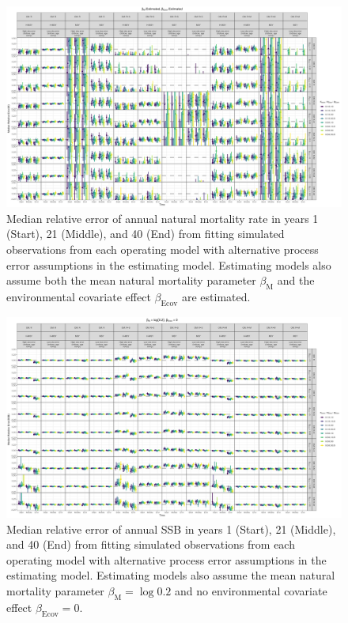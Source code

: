 \documentclass[
  12pt,
]{article}
\begin{document}
\begin{landscape}
\begin{figure}
\caption{Median relative error of annual natural mortality rate in years 1 (Start), 21 (Middle), and 40 (End) from fitting simulated observations from each operating model with alternative process error assumptions in the estimating model. Estimating models also assume both the mean natural mortality parameter $\beta_\text{M}$ and the environmental covariate effect $\beta_\text{Ecov}$ are estimated.}\label{annual_M_bias_M_estimated_beta_estimated}
\begin{center}
\includegraphics[height = \textheight]{annual_M_bias_all_PE_effect_M_estimated_beta_estimated.png}
\end{center}
\end{figure}
\end{landscape}

\begin{landscape}
\begin{figure}
\caption{Median relative error of annual SSB in years 1 (Start), 21 (Middle), and 40 (End) from fitting simulated observations from each operating model with alternative process error assumptions in the estimating model. Estimating models also assume the mean natural mortality parameter $\beta_\text{M} = \log 0.2$ and no environmental covariate effect $\beta_\text{Ecov} = 0$.}\label{SSB_bias_M_fixed_beta_fixed}
\begin{center}
\includegraphics[height = \textheight]{SSB_bias_all_PE_effect_M_fixed_beta_fixed.png}
\end{center}
\end{figure}
\end{landscape}
\end{document}
